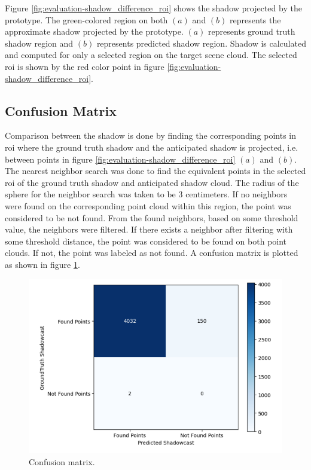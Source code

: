 Figure \ref{fig:evaluation-shadow_difference_roi} shows the shadow projected by the prototype. The green-colored region on both \((a)\) and \((b)\) represents the approximate shadow projected by the prototype. \((a)\) represents ground truth shadow region and \((b)\) represents predicted shadow region.  Shadow is calculated and computed for only a selected region on the target scene cloud. The selected \acrfull{roi} is shown by the red color point in figure \ref{fig:evaluation-shadow_difference_roi}.

\subsection{Confusion Matrix}
Comparison between the shadow is done by finding the corresponding points in \acrshort{roi} where the ground truth shadow and the anticipated shadow is projected, i.e. between points in figure \ref{fig:evaluation-shadow_difference_roi} \((a)\) and \((b)\). The nearest neighbor search was done to find the equivalent points in the selected \acrshort{roi} of the ground truth shadow and anticipated shadow cloud. The radius of the sphere for the neighbor search was taken to be 3 centimeters. If no neighbors were found on the corresponding point cloud within this region, the point was considered to be not found. From the found neighbors, based on some threshold value, the neighbors were filtered. If there exists a neighbor after filtering with some threshold distance, the point was considered to be found on both point clouds. If not, the point was labeled as not found. A confusion matrix is plotted as shown in figure \ref{fig:evaluation_cm}.

\begin{figure}[htbp]
    \centering
    \includegraphics[width=1\linewidth]{97_graphics/evaluation/cm_shadowcast.pdf}
    \caption{Confusion matrix.}
    \label{fig:evaluation_cm}
\end{figure}

